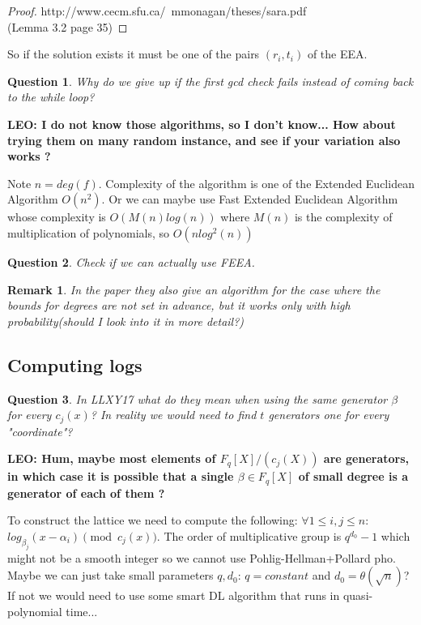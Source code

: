 \documentclass[12pt]{article}
\newtheorem{question}{Question}
\newtheorem{remark}{Remark}
\begin{document}
\begin{proof}
http://www.cecm.sfu.ca/~mmonagan/theses/sara.pdf \\(Lemma 3.2 page 35)
\end{proof}

So if the solution exists it must be one of the pairs $(r_i, t_i)$ of the EEA.

\begin{question}
Why do we give up if the first gcd check fails instead of coming back to the while loop?
\end{question}
{\bf LEO: I do not know those algorithms, so I don't know... How about trying them on many random instance, and see if your variation also works ?}


Note $n = deg(f)$.
Complexity of the algorithm is one of the Extended Euclidean Algorithm $O(n^2)$. Or we can maybe use Fast Extended Euclidean Algorithm whose complexity is $O(M(n)log(n))$ where $M(n)$ is the complexity of multiplication of polynomials, so $O(nlog^2(n))$
\begin{question}
Check if we can actually use FEEA.
\end{question}
\begin{remark}
In the paper they also give an algorithm for the case where the bounds for degrees are not set in advance, but it works only with high probability(should I look into it in more detail?)
\end{remark}
\subsection{Computing logs}
\begin{question}
In LLXY17 what do they mean when using the same generator $\beta$ for every $c_j(x)$? In reality we would need to find $t$ generators one for every "coordinate"?
\end{question}
{\bf LEO: Hum, maybe most elements of $F_q[X]/(c_j(X))$ are generators, in which case it is possible that a single $\beta \in F_q[X]$ of small degree is a generator of each of them ?}

To construct the lattice we need to compute the following:
$\forall 1 \leq i,j \leq n :$ $log_{\beta_j}(x - \alpha_i) \pmod{c_j(x)}$. The order of multiplicative group is $q^{d_0} - 1$ which might not be a smooth integer so we cannot use Pohlig-Hellman+Pollard pho. Maybe we can just take small parameters $q, d_0$: $q=constant$ and $d_0 = \theta(\sqrt n)$? If not we would need to use some smart DL algorithm that runs in quasi-polynomial time...
\end{document}
